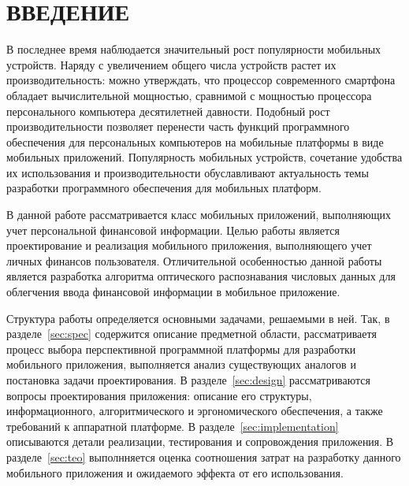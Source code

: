 \section*{ВВЕДЕНИЕ}

В последнее время наблюдается значительный рост
популярности мобильных устройств.
Наряду с увеличением общего числа устройств растет их производительность:
можно утверждать, что процессор современного смартфона обладает
вычислительной мощностью, сравнимой с мощностью процессора
персонального компьютера десятилетней давности.
Подобный рост производительности позволяет перенести часть функций
программного обеспечения для персональных компьютеров
на мобильные платформы в виде мобильных приложений.
Популярность мобильных устройств,
сочетание удобства их использования и производительности
обуславливают актуальность темы разработки программного
обеспечения для мобильных платформ.

В данной работе рассматривается класс мобильных приложений,
выполняющих учет персональной финансовой информации.
Целью работы является проектирование и реализация мобильного приложения,
выполняющего учет личных финансов пользователя.
Отличительной особенностью данной работы является разработка алгоритма
оптического распознавания числовых данных для облегчения ввода
финансовой информации в мобильное приложение.

Структура работы определяется основными задачами, решаемыми в ней.
Так, в разделе~\ref{sec:spec} содержится описание предметной области,
рассматриваетя процесс выбора перспективной программной платформы
для разработки мобильного приложения,
выполняется анализ существующих аналогов и постановка задачи проектирования.
В разделе~\ref{sec:design} рассматриваются вопросы проектирования приложения:
описание его структуры, информационного,
алгоритмического и эргономического обеспечения,
а также требований к аппаратной платформе.
В разделе~\ref{sec:implementation} описываются детали реализации,
тестирования и сопровождения приложения.
В разделе~\ref{sec:teo} выполнняется оценка соотношения затрат
на разработку данного мобильного приложения и ожидаемого эффекта
от его использования.
